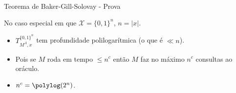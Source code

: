\documentclass[landscape, 9pt]{beamer}
\newcommand{\binalph}{\{0, 1\}}
\begin{document}

\begin{frame} {Teorema de Baker-Gill-Solovay - Prova}

No caso especial em que $\mathcal{X} = \binalph^{n}$, $n = \lvert x \rvert$.

\begin{itemize}

	\item $T_{M^{A}, x}^{\binalph^{n}}$ tem profundidade polilogarítmica (o que é $\ll n$).
		
	\item Pois se $M$ roda em tempo $\leq n^{c}$ então $M$ faz no máximo $n^{c}$ consultas ao oráculo.
		
	\item $n^{c} = \polylog(2^{n})$.
		
\end{itemize}

\end{frame}

\end{document}
